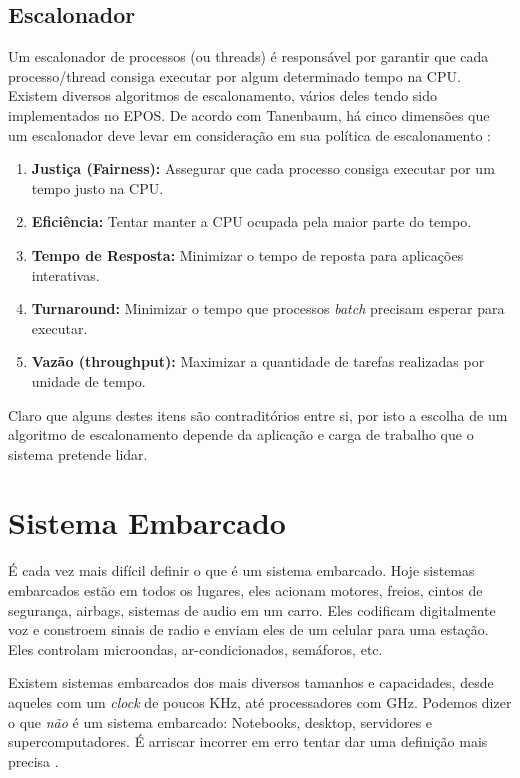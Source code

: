 \subsection{Escalonador}
\label{escalonador}

Um escalonador de processos (ou threads) é responsável por garantir que cada processo/thread consiga executar por algum determinado tempo na CPU. Existem diversos algoritmos de escalonamento, vários deles tendo sido implementados no EPOS. De acordo com Tanenbaum, há cinco dimensões que um escalonador deve levar em consideração em sua política de escalonamento \cite{tanenbaum}:

\begin{enumerate}
\item \textbf{Justiça (Fairness):} Assegurar que cada processo consiga executar por um tempo justo na CPU.
\item \textbf{Eficiência:} Tentar manter a CPU ocupada pela maior parte do tempo.
\item \textbf{Tempo de Resposta:} Minimizar o tempo de reposta para aplicações interativas.
\item \textbf{Turnaround:} Minimizar o tempo que processos \emph{batch} precisam esperar para executar.
\item \textbf{Vazão (throughput):} Maximizar a quantidade de tarefas realizadas por unidade de tempo.
\end{enumerate}

Claro que alguns destes itens são contraditórios entre si, por isto a escolha de um algoritmo de escalonamento depende da aplicação e carga de trabalho que o sistema pretende lidar.


\section{Sistema Embarcado}

É cada vez mais difícil definir o que é um sistema embarcado. Hoje sistemas embarcados estão em todos os lugares, eles acionam motores, freios, cintos de segurança, airbags, sistemas de audio em um carro. Eles codificam digitalmente voz e constroem sinais de radio e enviam eles de um celular para uma estação. Eles controlam microondas, ar-condicionados, semáforos, etc.

Existem sistemas embarcados dos mais diversos tamanhos e capacidades, desde aqueles com um \emph{clock} de poucos KHz, até processadores com GHz. Podemos dizer o que \emph{não} é um sistema embarcado: Notebooks, desktop, servidores e supercomputadores. É arriscar incorrer em erro tentar dar uma definição mais precisa \cite{leeseshia}.

